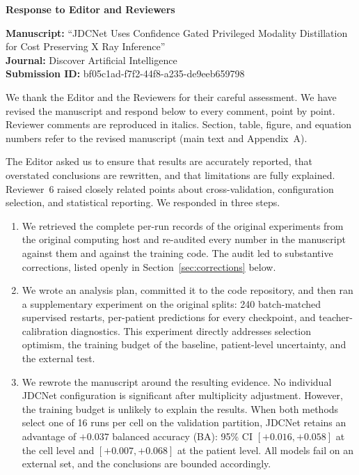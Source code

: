 \documentclass[11pt]{article}
\begin{document}
\sloppy

\begin{center}
{\LARGE\bfseries Response to Editor and Reviewers}
\end{center}

\noindent\textbf{Manuscript:} ``JDCNet Uses Confidence Gated Privileged Modality Distillation for Cost Preserving X Ray Inference''\\
\textbf{Journal:} Discover Artificial Intelligence\\
\textbf{Submission ID:} bf05c1ad-f7f2-44f8-a235-de9eeb659798

We thank the Editor and the Reviewers for their careful assessment. We have
revised the manuscript and respond below to every comment, point by point.
Reviewer comments are reproduced in italics. Section, table, figure, and
equation numbers refer to the revised manuscript (main text and Appendix~A).

The Editor asked us to ensure that results are accurately reported, that
overstated conclusions are rewritten, and that limitations are fully
explained. Reviewer~6 raised closely related points about cross-validation,
configuration selection, and statistical reporting. We responded in three steps.
\begin{enumerate}[leftmargin=1.6em]
  \item We retrieved the complete per-run records of the original experiments from the original computing host and re-audited every number in the manuscript against them and against the training code. The audit led to substantive corrections, listed openly in Section~\ref{sec:corrections} below.
  \item We wrote an analysis plan, committed it to the code repository, and then ran a supplementary experiment on the original splits: 240 batch-matched supervised restarts, per-patient predictions for every checkpoint, and teacher-calibration diagnostics. This experiment directly addresses selection optimism, the training budget of the baseline, patient-level uncertainty, and the external test.
  \item We rewrote the manuscript around the resulting evidence. No individual JDCNet configuration is significant after multiplicity adjustment. However, the training budget is unlikely to explain the results. When both methods select one of 16 runs per cell on the validation partition, JDCNet retains an advantage of $+0.037$ balanced accuracy (BA): 95\% CI $[+0.016,+0.058]$ at the cell level and $[+0.007,+0.068]$ at the patient level. All models fail on an external set, and the conclusions are bounded accordingly.
\end{enumerate}
\end{document}
